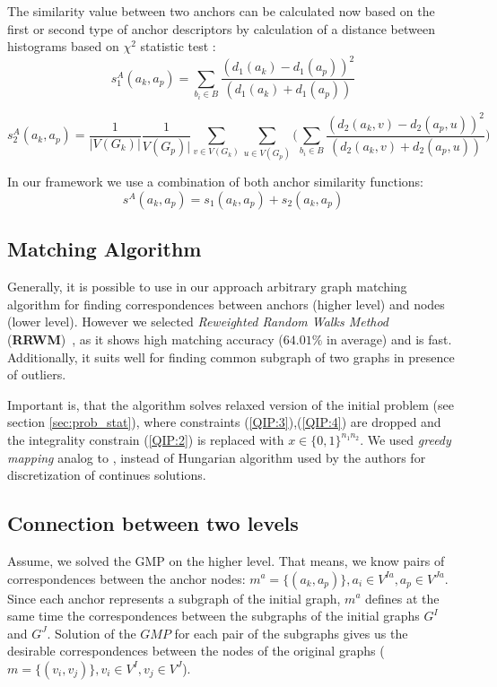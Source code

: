 \documentclass[
	fontsize=12pt,
	paper=a4,
	twoside=false,
	numbers=noenddot,
	plainheadsepline,
	toc=listof,
	toc=bibliography
]{scrartcl}
\begin{document}
The similarity value between two anchors can be calculated now based on the first or second type of anchor descriptors by calculation of a distance between histograms based on $\chi^2$ statistic test \cite{Weken2004_ChiSqTest}:
\begin{equation}
s^A_1(a_k, a_p) = \sum_{b_i\in B}\frac{(d_1(a_k)-d_1(a_p))^2}{(d_1(a_k)+d_1(a_p))}
\end{equation}

\begin{equation}
s^A_2(a_k, a_p) = \frac{1}{|V(G_k)|}\frac{1}{V(G_p)|}\sum_{v\in V(G_k)}\sum_{u\in V(G_p)} \big(\sum_{b_i\in B}\frac{(d_2(a_k,v)-d_2(a_p,u))^2}{(d_2(a_k,v)+d_2(a_p,u))}\big)
\end{equation}

In our framework we use a combination of both anchor similarity functions:
\begin{equation}
s^A(a_k, a_p) = s_1(a_k, a_p)+s_2(a_k, a_p) 
\end{equation}


\subsection{Matching Algorithm}

Generally, it is possible to use in our approach arbitrary graph matching algorithm for finding correspondences between anchors (higher level) and nodes (lower level). However we selected \emph{Reweighted Random Walks Method} (\textbf{RRWM})~\cite{Cho2010_RRWM}, as it shows high matching accuracy ($64.01\%$ in average) and is fast. Additionally, it	 suits well for finding common subgraph of two graphs in presence of outliers.

Important is, that the algorithm solves relaxed version of the initial problem (see section \ref{sec:prob_stat}), where constraints (\ref{QIP:3}),(\ref{QIP:4}) are dropped and the integrality constrain (\ref{QIP:2}) is replaced with $x\in \{0,1\}^{n_1n_2}$. We used \emph{greedy mapping} analog to \cite{Leordeanu2005}, instead of Hungarian algorithm used by the authors for discretization of continues solutions.

\subsection{Connection between two levels}
Assume, we solved the GMP on the higher level. That means, we know pairs of correspondences between the anchor nodes: $m^a = \{(a_k, a_p)\}, a_i\in V^{Ia}, a_p\in V^{Ja}$. Since each anchor represents a subgraph of the initial graph, $m^a$ defines at the same time the correspondences between the subgraphs of the initial graphs $G^I$ and $G^J$. Solution of the $GMP$ for each pair of the subgraphs gives us the desirable correspondences between the nodes of the original graphs ($m = \{(v_i, v_j)\}, v_i\in V^{I}, v_j\in V^{J}$).
\end{document}
